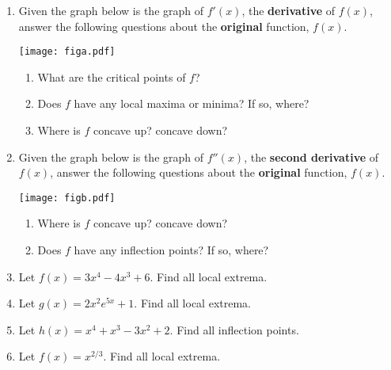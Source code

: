 \documentclass[11pt]{article}
\begin{document}
\drawtitle
\begin{enumerate}

\item Given the graph below is the graph of $f'(x)$, the
  \textbf{derivative} of $f(x)$, answer the following questions about
  the \textbf{original} function, $f(x)$.
  \begin{center}
    \texttt{[image: figa.pdf]}
  \end{center}
  \begin{enumerate}
  \item What are the critical points of $f$?
    \vfill
  \item Does $f$ have any local maxima or minima? If so, where?
    \vfill
  \item Where is $f$ concave up? concave down?
    \vfill
  \end{enumerate}

  \newpage

\item Given the graph below is the graph of $f''(x)$, the
  \textbf{second derivative} of $f(x)$, answer the following questions
  about the \textbf{original} function, $f(x)$.
  \begin{center}
    \texttt{[image: figb.pdf]}
  \end{center}
  \begin{enumerate}
  \item Where is $f$ concave up? concave down?
    \vfill
  \item Does $f$ have any inflection points? If so, where?
    \vfill
  \end{enumerate}

\newpage

\item Let $f(x) = 3x^4 - 4x^3 + 6$. Find all local extrema.

\vfill

\item Let $g(x) = 2x^2e^{5x} + 1$. Find all local extrema.

  \vfill

\newpage

\item Let $h(x) = x^4 + x^3 - 3x^2 + 2$. Find all inflection points.

  \vfill

\item Let $f(x) = x^{2/3}$. Find all local extrema.

  \vfill

\end{enumerate}
\end{document}
